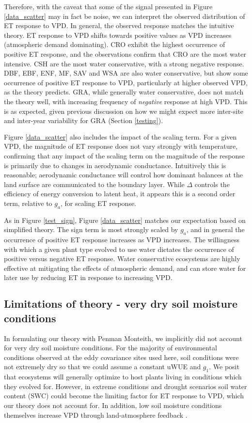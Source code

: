 \documentclass[draft,linenumbers]{agujournal}
\begin{document}
Therefore, with the caveat that some of the signal presented in Figure
\ref{data_scatter} may in fact be noise, we can interpret the observed
distribution of ET response to VPD. In general, the observed response
matches the intuitive theory. ET response to VPD shifts towards
positive values as VPD increases (atmospheric demand dominating). CRO
exhibit the highest occurrence of positive ET response, and the
observations confirm that CRO are the most water intensive. CSH are
the most water conservative, with a strong negative response. DBF,
EBF, ENF, MF, SAV and WSA are also water conservative, but show some
occurrence of positive ET response to VPD, particularly at higher
observed VPD, as the theory predicts. GRA, while generally water
conservative, does not match the theory well, with increasing frequency of
\textit{negative} response at high VPD. This is as expected, given
previous discussion on how we might expect more inter-site and inter-year variability for GRA (Section \ref{testing}).

Figure \ref{data_scatter} also includes the impact of the scaling
term. For a given VPD, the magnitude of ET response does not vary
strongly with temperature, confirming that any impact of the scaling
term on the magnitude of the response is primarily due to changes in
aerodynamic conductance. Intuitively this is reasonable; aerodynamic
conductance will control how dominant balances at the land surface are
communicated to the boundary layer. While $\Delta$ controls the
efficiency of energy conversion to latent heat, it appears this is a
second order term, relative to $g_a$, for scaling ET response.

As in Figure \ref{test_sign}, Figure \ref{data_scatter} matches our
expectation based on simplified theory. The sign term is most strongly
scaled by $g_a$, and in general the occurrence of positive ET response
increases as VPD increases. The willingness with which a given plant type
evolved to use water dictates the occurrence of positive versus
negative ET response. Water conservative ecosystems are highly effective
at mitigating the effects of atmospheric demand, and can store water
for later use by reducing ET in response to increasing VPD.

\subsection{Limitations of theory - very dry soil moisture conditions}
\label{swc_section}
In formulating our theory with Penman Monteith, we implicitly did not
account for very dry soil moisture conditions. For the majority of
environmental conditions observed at the eddy covariance sites used
here, soil conditions were not extremely dry so that we could assume a
constant uWUE and $g_1$. We posit that ecosystems will generally
optimize to host plants living in conditions which they evolved
for. However, in extreme conditions and drought scenarios soil water
content (SWC) could become the limiting factor for ET response to VPD,
which our theory does not account for. In addition, low soil moisture
conditions themselves increase VPD through land-atmosphere feedback
\citep[][]{Bouchet_1963, Morton_1965, Brutsaert_1999, Ozdogan_2006,
  Salvucci_2013, Gentine_2016, Berg_2016}.
\end{document}
